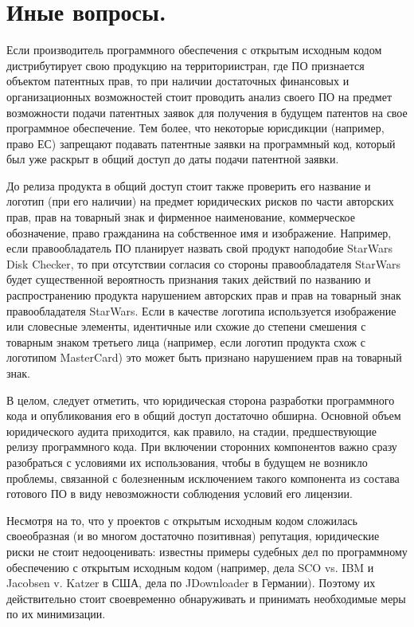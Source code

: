 \documentclass[10pt, a5paper]{article}
\begin{document}
\section*{Иные вопросы.} 
Если производитель программного обеспечения с открытым исходным кодом дистрибутирует свою продукцию на территории\linebreak стран, где ПО признается объектом патентных прав, то при наличии достаточных финансовых и организационных возможностей стоит проводить анализ своего ПО на предмет возможности подачи патентных заявок для получения в будущем патентов на свое программное обеспечение. Тем более, что некоторые юрисдикции (например, право ЕС) запрещают подавать патентные заявки на программный код, который был уже раскрыт в общий доступ до даты подачи патентной заявки.

До релиза продукта в общий доступ стоит также проверить его название и логотип (при его наличии) на предмет юридических рисков по части авторских прав, прав на товарный знак и фирменное наименование, коммерческое обозначение, право гражданина на собственное имя и изображение. Например, если правообладатель ПО планирует назвать свой продукт наподобие StarWars Disk Checker, то при отсутствии согласия со стороны правообладателя StarWars будет существенной вероятность признания таких действий по названию и распространению продукта нарушением авторских прав и прав на товарный знак правообладателя StarWars. Если в качестве логотипа используется изображение или словесные элементы, идентичные или схожие до степени смешения с товарным знаком третьего лица (например, если логотип продукта схож с логотипом MasterCard) это может быть признано нарушением прав на товарный знак.

В целом, следует отметить, что юридическая сторона разработки программного кода и опубликования его в общий доступ достаточно обширна. Основной объем юридического аудита приходится, как правило, на стадии, предшествующие релизу программного кода. При включении сторонних компонентов важно сразу разобраться с условиями их использования, чтобы в будущем не возникло проблемы, связанной с болезненным исключением такого компонента из состава готового ПО в виду невозможности соблюдения условий его лицензии.

Несмотря на то, что у проектов с открытым исходным кодом сложилась своеобразная (и во многом достаточно позитивная) репутация, юридические риски не стоит недооценивать: известны примеры судебных дел по программному обеспечению с открытым исходным кодом (например, дела SCO vs. IBM  и Jacobsen v. Katzer  в США, дела по JDownloader  в Германии). Поэтому их действительно стоит своевременно обнаруживать и принимать необходимые меры по их минимизации.
\end{document}
